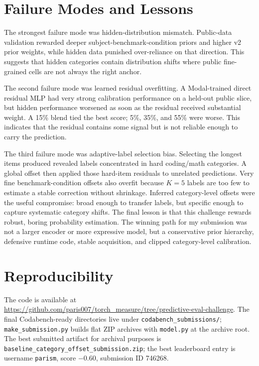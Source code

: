 \documentclass{article}
\begin{document}
\section{Failure Modes and Lessons}

The strongest failure mode was hidden-distribution mismatch. Public-data validation rewarded deeper subject-benchmark-condition priors and higher v2 prior weights, while hidden data punished over-reliance on that direction. This suggests that hidden categories contain distribution shifts where public fine-grained cells are not always the right anchor.

The second failure mode was learned residual overfitting. A Modal-trained direct residual MLP had very strong calibration performance on a held-out public slice, but hidden performance worsened as soon as the residual received substantial weight. A 15\% blend tied the best score; 5\%, 35\%, and 55\% were worse. This indicates that the residual contains some signal but is not reliable enough to carry the prediction.

The third failure mode was adaptive-label selection bias. Selecting the longest items produced revealed labels concentrated in hard coding/math categories. A global offset then applied those hard-item residuals to unrelated predictions. Very fine benchmark-condition offsets also overfit because $K=5$ labels are too few to estimate a stable correction without shrinkage. Inferred category-level offsets were the useful compromise: broad enough to transfer labels, but specific enough to capture systematic category shifts. The final lesson is that this challenge rewards robust, boring probability estimation. The winning path for my submission was not a larger encoder or more expressive model, but a conservative prior hierarchy, defensive runtime code, stable acquisition, and clipped category-level calibration.

\section{Reproducibility}

\begin{flushleft}
The code is available at \url{https://github.com/paris007/torch_measure/tree/predictive-eval-challenge}. The final Codabench-ready directories live under \texttt{codabench\_submissions/}; \texttt{make\_submission.py} builds flat ZIP archives with \texttt{model.py} at the archive root. The best submitted artifact for archival purposes is \texttt{baseline\_category\_offset\_submission.zip}; the best leaderboard entry is username \texttt{parism}, score $-0.60$, submission ID 746268.
\end{flushleft}
\end{document}
